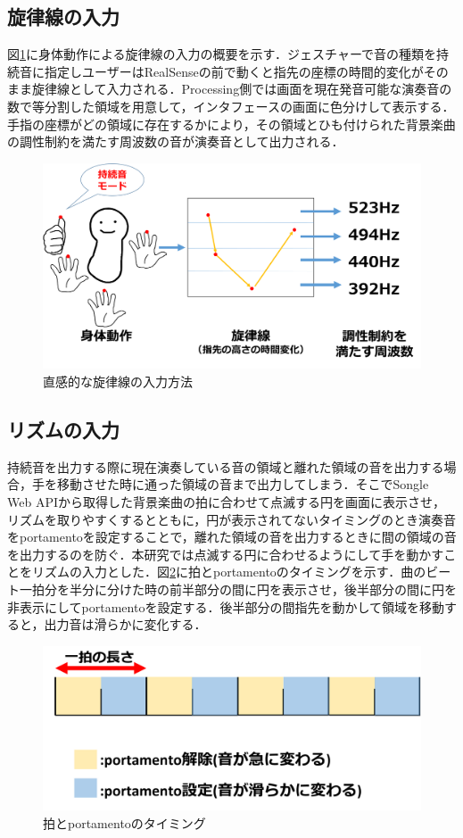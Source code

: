 \subsection{旋律線の入力}
図\ref{img:note1}に身体動作による旋律線の入力の概要を示す．ジェスチャーで音の種類を持続音に指定しユーザーはRealSenseの前で動くと指先の座標の時間的変化がそのまま旋律線として入力される．Processing側では画面を現在発音可能な演奏音の数で等分割した領域を用意して，インタフェースの画面に色分けして表示する．手指の座標がどの領域に存在するかにより，その領域とひも付けられた背景楽曲の調性制約を満たす周波数の音が演奏音として出力される．
\begin{figure}[t]
	\begin{center}
		\includegraphics[width=0.9\linewidth]{assets/img/in_note.png}
		\caption{直感的な旋律線の入力方法}
		\label{img:note1}
	\end{center}
\end{figure}
\subsection{リズムの入力}
持続音を出力する際に現在演奏している音の領域と離れた領域の音を出力する場合，手を移動させた時に通った領域の音まで出力してしまう．そこでSongle Web APIから取得した背景楽曲の拍に合わせて点滅する円を画面に表示させ，リズムを取りやすくするとともに，円が表示されてないタイミングのとき演奏音をportamentoを設定することで，離れた領域の音を出力するときに間の領域の音を出力するのを防ぐ．本研究では点滅する円に合わせるようにして手を動かすことをリズムの入力とした．図\ref{img:portamento}に拍とportamentoのタイミングを示す．曲のビート一拍分を半分に分けた時の前半部分の間に円を表示させ，後半部分の間に円を非表示にしてportamentoを設定する．後半部分の間指先を動かして領域を移動すると，出力音は滑らかに変化する．
\begin{figure}[t]
	\begin{center}
		\includegraphics[width=1\linewidth]{assets/img/portamento.png}
		\caption{拍とportamentoのタイミング}
		\label{img:portamento}
	\end{center}
\end{figure}
